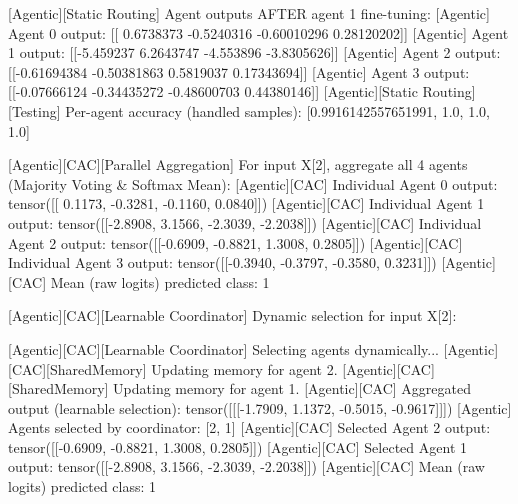 [Agentic][Static Routing] Agent outputs AFTER agent 1 fine-tuning:
[Agentic] Agent 0 output: [[ 0.6738373  -0.5240316  -0.60010296  0.28120202]]
[Agentic] Agent 1 output: [[-5.459237   6.2643747 -4.553896  -3.8305626]]
[Agentic] Agent 2 output: [[-0.61694384 -0.50381863  0.5819037   0.17343694]]
[Agentic] Agent 3 output: [[-0.07666124 -0.34435272 -0.48600703  0.44380146]]
[Agentic][Static Routing][Testing] Per-agent accuracy (handled samples): [0.9916142557651991, 1.0, 1.0, 1.0]

[Agentic][CAC][Parallel Aggregation] For input X[2], aggregate all 4 agents (Majority Voting & Softmax Mean):
[Agentic][CAC] Individual Agent 0 output: tensor([[ 0.1173, -0.3281, -0.1160,  0.0840]])
[Agentic][CAC] Individual Agent 1 output: tensor([[-2.8908,  3.1566, -2.3039, -2.2038]])
[Agentic][CAC] Individual Agent 2 output: tensor([[-0.6909, -0.8821,  1.3008,  0.2805]])
[Agentic][CAC] Individual Agent 3 output: tensor([[-0.3940, -0.3797, -0.3580,  0.3231]])
[Agentic][CAC] Mean (raw logits) predicted class: 1

[Agentic][CAC][Learnable Coordinator] Dynamic selection for input X[2]:

[Agentic][CAC][Learnable Coordinator] Selecting agents dynamically...
[Agentic][CAC][SharedMemory] Updating memory for agent 2.
[Agentic][CAC][SharedMemory] Updating memory for agent 1.
[Agentic][CAC] Aggregated output (learnable selection): tensor([[[-1.7909,  1.1372, -0.5015, -0.9617]]])
[Agentic] Agents selected by coordinator: [2, 1]
[Agentic][CAC] Selected Agent 2 output: tensor([[-0.6909, -0.8821,  1.3008,  0.2805]])
[Agentic][CAC] Selected Agent 1 output: tensor([[-2.8908,  3.1566, -2.3039, -2.2038]])
[Agentic][CAC] Mean (raw logits) predicted class: 1